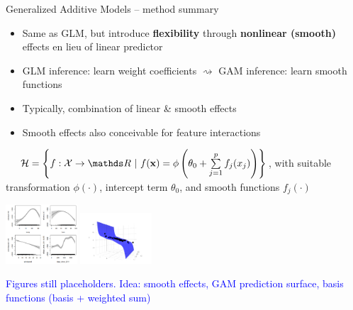 \begin{vbframe}{Generalized Additive Models -- method summary}

  
 
\medskip

\begin{itemize}
  \item Same as GLM, but introduce \textbf{flexibility} through
  \textbf{nonlinear (smooth)} effects en lieu of linear predictor
  \item GLM inference: learn weight coefficients $\rightsquigarrow$ GAM
  inference: learn smooth functions
  \item Typically, combination of linear \& smooth effects
  \item Smooth effects also conceivable for feature interactions
\end{itemize}
\medskip

 ~~
$\Hspace = \left\{f: \Xspace \to \R ~|~\fx = \phi \left(\theta_0 + \sumjp
f_j(x_j) \right) \right\}$,
with suitable transformation $\phi(\cdot)$, intercept term $\theta_0$, and smooth
functions $f_j(\cdot)$

\vfill

\includegraphics[width=0.2\textwidth]{figure/smooth_effects}
\includegraphics[width=0.2\textwidth]{figure/reg_poly_biv}

\textcolor{blue}{Figures still placeholders. Idea: smooth effects, GAM
prediction surface, basis functions (basis + weighted sum)}

\framebreak



\end{vbframe}
